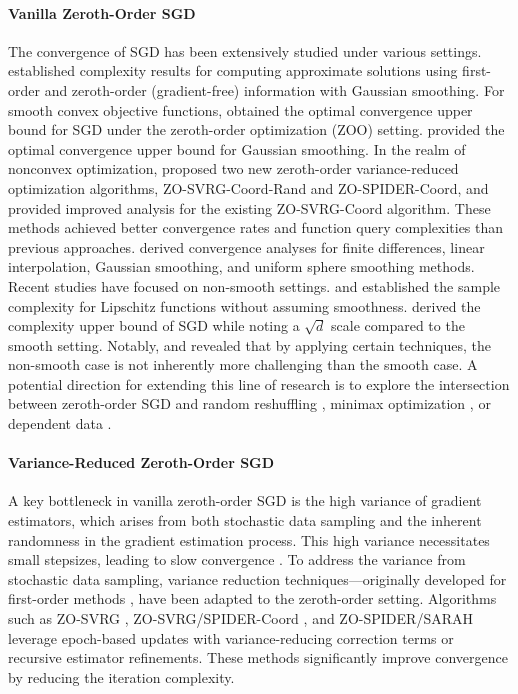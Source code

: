 \documentclass{article}
\theoremstyle{definition}
\theoremstyle{plain}
\theoremstyle{remark}
\begin{document}
\paragraph{Vanilla Zeroth-Order SGD} The convergence of SGD has been extensively studied under various settings. \citet{ghadimi2013stochastic} established complexity results for computing approximate solutions using first-order and zeroth-order (gradient-free) information with Gaussian smoothing. For smooth convex objective functions, \citet{duchi2015optimal} obtained the optimal convergence upper bound for SGD under the zeroth-order optimization (ZOO) setting. \citet{nesterov2017random} provided the optimal convergence upper bound for Gaussian smoothing. In the realm of nonconvex optimization, \citet{ji2019improved} proposed two new zeroth-order variance-reduced optimization algorithms, ZO-SVRG-Coord-Rand and ZO-SPIDER-Coord, and provided improved analysis for the existing ZO-SVRG-Coord algorithm. These methods achieved better convergence rates and function query complexities than previous approaches. \citet{berahas2022theoretical} derived convergence analyses for finite differences, linear interpolation, Gaussian smoothing, and uniform sphere smoothing methods. Recent studies have focused on non-smooth settings. \citet{davis2022gradient} and \citet{zhang2020complexity} established the sample complexity for Lipschitz functions without assuming smoothness. \citet{lin2022gradient} derived the complexity upper bound of SGD while noting a $\sqrt{d}$ scale compared to the smooth setting. Notably, \citet{rando2023optimal} and \citet{kornowski2024algorithm} revealed that by applying certain techniques, the non-smooth case is not inherently more challenging than the smooth case. A potential direction for extending this line of research is to explore the intersection between zeroth-order SGD and random reshuffling \citep{ma2020understanding,mishchenko2020random}, minimax optimization \citep{chen2022accelerated}, or dependent data \citep{ma2022data}.
 

\paragraph{Variance-Reduced Zeroth-Order SGD}  
A key bottleneck in vanilla zeroth-order SGD is the high variance of gradient estimators, which arises from both stochastic data sampling and the inherent randomness in the gradient estimation process. This high variance necessitates small stepsizes, leading to slow convergence \citep{liu2020primer}. To address the variance from stochastic data sampling, variance reduction techniques—originally developed for first-order methods \citep{fang2018spider,defazio2014saga,johnson2013accelerating,nguyen2017sarah}, have been adapted to the zeroth-order setting. Algorithms such as ZO-SVRG \citep{liu2018zeroth,huang2019faster,gu2021black}, ZO-SVRG/SPIDER-Coord \citep{ji2019improved}, and ZO-SPIDER/SARAH \citep{fang2018spider,ji2019improved,chen2023faster} leverage epoch-based updates with variance-reducing correction terms or recursive estimator refinements. These methods significantly improve convergence by reducing the iteration complexity.
\end{document}
